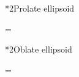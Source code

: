 \documentclass[\mainfilename]{subfiles}
\begin{document}
\begin{sectionBox}
    \begin{sectionBox}*2{Prolate ellipsoid} %
        \begin{BM}
            = 
        \end{BM}
    \end{sectionBox}

    \begin{sectionBox}*2{Oblate ellipsoid} %
        \begin{BM}
            = 
        \end{BM}
    \end{sectionBox}

\end{sectionBox}


\end{document}
